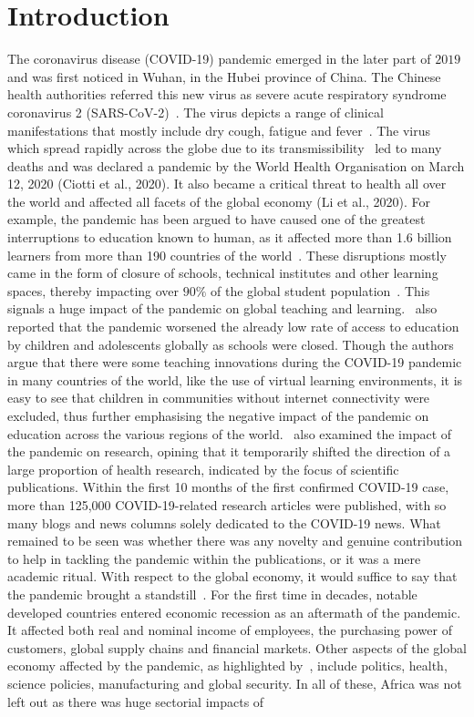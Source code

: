 \documentclass[a4paper, 12pt]{article}
\begin{document}
    \section{Introduction}\label{sec1:introduction}
    The coronavirus disease (COVID-19) pandemic emerged in the later part of $2019$ and was first noticed in Wuhan, in the Hubei province of China. The Chinese health authorities referred this new virus as severe acute respiratory syndrome coronavirus 2 (SARS-CoV-2)~\parencite{lalaoui2020could}. The virus depicts a range of clinical manifestations that mostly include dry cough, fatigue and fever~\parencite{shi2020overview}. The virus which spread rapidly across the globe due to its transmissibility~\parencite{weston2020covid} led to many deaths and was declared a pandemic by the World Health Organisation on March 12, 2020 (Ciotti et al., 2020). It also became a critical threat to health all over the world and affected all facets of the global economy (Li et al., 2020). For example, the pandemic has been argued to have caused one of the greatest interruptions to education known to human, as it affected more than 1.6 billion learners from more than 190 countries of the world~\parencite{pokhrel2021literature}. These disruptions mostly came in the form of closure of schools, technical institutes and other learning spaces, thereby impacting over $90\%$ of the global student population~\parencite{karakose2021impact}. This signals a huge impact of the pandemic on global teaching and learning.~\cite{mishra2020online} also reported that the pandemic worsened the already low rate of access to education by children and adolescents globally as schools were closed. Though the authors argue that there were some teaching innovations during the COVID-19 pandemic in many countries of the world, like the use of virtual learning environments, it is easy to see that children in communities without internet connectivity were excluded, thus further emphasising the negative impact of the pandemic on education across the various regions of the world.~\cite{fraser2020preprinting} also examined the impact of the pandemic on research, opining that it temporarily shifted the direction of a large proportion of health research, indicated by the focus of scientific publications. Within the first 10 months of the first confirmed COVID-19 case, more than 125,000 COVID-19-related research articles were published, with so many blogs and news columns solely dedicated to the COVID-19 news. What remained to be seen was whether there was any novelty and genuine contribution to help in tackling the pandemic within the publications, or it was a mere academic ritual. With respect to the global economy, it would suffice to say that the pandemic brought a standstill~\parencite{accikgoz2020early}. For the first time in decades, notable developed countries entered economic recession as an aftermath of the pandemic. It affected both real and nominal income of employees, the purchasing power of customers, global supply chains and financial markets. Other aspects of the global economy affected by the pandemic, as highlighted by~\cite{accikgoz2020early}, include politics, health, science policies, manufacturing and global security. In all of these, Africa was not left out as there was huge sectorial impacts of 
\end{document}
